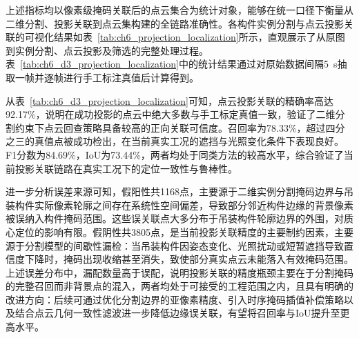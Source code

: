 上述指标均以像素级掩码关联后的点云集合为统计对象，能够在统一口径下衡量从二维分割、投影关联到点云集构建的全链路准确性。各构件实例分割与点云投影关联的可视化结果如表~\ref{tab:ch6_projection_localization}所示，直观展示了从原图到实例分割、点云投影及筛选的完整处理过程。表~\ref{tab:ch6_d3_projection_localization}中的统计结果通过对原始数据间隔5~s抽取一帧并逐帧进行手工标注真值后计算得到。

从表~\ref{tab:ch6_d3_projection_localization}可知，点云投影关联的精确率高达92.17\%，说明在成功投影的点云中绝大多数与手工标定真值一致，验证了二维分割约束下点云回查策略具备较高的正向关联可信度。召回率为78.33\%，超过四分之三的真值点被成功检出，在当前真实工况的遮挡与光照变化条件下表现良好。F1分数为84.69\%，IoU为73.44\%，两者均处于同类方法的较高水平，综合验证了当前投影关联链路在真实工况下的定位一致性与鲁棒性。

进一步分析误差来源可知，假阳性共1168点，主要源于二维实例分割掩码边界与吊装构件实际像素轮廓之间存在系统性空间偏差，导致部分邻近构件边缘的背景像素被误纳入构件掩码范围。这些误关联点大多分布于吊装构件轮廓边界的外围，对质心定位的影响有限。假阴性共3805点，是当前投影关联精度的主要制约因素，主要源于分割模型的间歇性漏检：当吊装构件因姿态变化、光照扰动或短暂遮挡导致置信度下降时，掩码出现收缩甚至消失，致使部分真实点云未能落入有效掩码范围。上述误差分布中，漏配数量高于误配，说明投影关联的精度瓶颈主要在于分割掩码的完整召回而非背景点的混入，两者均处于可接受的工程范围之内，且具有明确的改进方向：后续可通过优化分割边界的亚像素精度、引入时序掩码插值补偿策略以及结合点云几何一致性滤波进一步降低边缘误关联，有望将召回率与IoU提升至更高水平。

